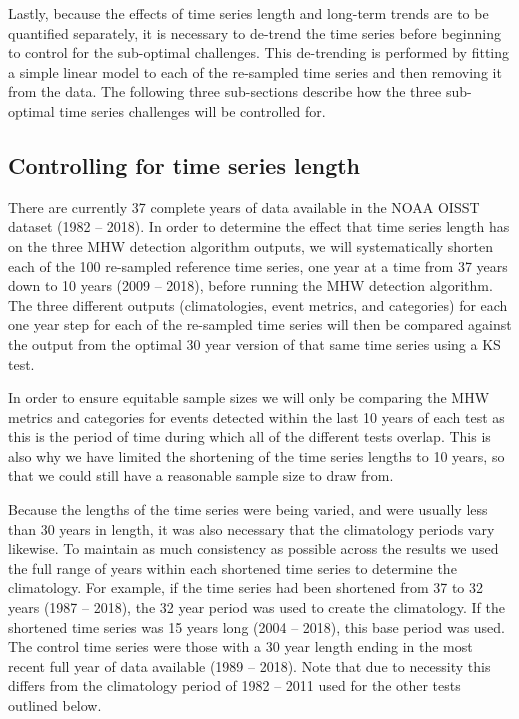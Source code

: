 \documentclass[]{article}
\begin{document}
Lastly, because the effects of time series length and long-term trends
are to be quantified separately, it is necessary to de-trend the time
series before beginning to control for the sub-optimal challenges. This
de-trending is performed by fitting a simple linear model to each of the
re-sampled time series and then removing it from the data. The following
three sub-sections describe how the three sub-optimal time series
challenges will be controlled for.

\subsection{Controlling for time series
length}\label{controlling-for-time-series-length}

There are currently 37 complete years of data available in the NOAA
OISST dataset (1982 -- 2018). In order to determine the effect that time
series length has on the three MHW detection algorithm outputs, we will
systematically shorten each of the 100 re-sampled reference time series,
one year at a time from 37 years down to 10 years (2009 -- 2018), before
running the MHW detection algorithm. The three different outputs
(climatologies, event metrics, and categories) for each one year step
for each of the re-sampled time series will then be compared against the
output from the optimal 30 year version of that same time series using a
KS test.

In order to ensure equitable sample sizes we will only be comparing the
MHW metrics and categories for events detected within the last 10 years
of each test as this is the period of time during which all of the
different tests overlap. This is also why we have limited the shortening
of the time series lengths to 10 years, so that we could still have a
reasonable sample size to draw from.

Because the lengths of the time series were being varied, and were
usually less than 30 years in length, it was also necessary that the
climatology periods vary likewise. To maintain as much consistency as
possible across the results we used the full range of years within each
shortened time series to determine the climatology. For example, if the
time series had been shortened from 37 to 32 years (1987 -- 2018), the
32 year period was used to create the climatology. If the shortened time
series was 15 years long (2004 -- 2018), this base period was used. The
control time series were those with a 30 year length ending in the most
recent full year of data available (1989 -- 2018). Note that due to
necessity this differs from the climatology period of 1982 -- 2011 used
for the other tests outlined below.
\end{document}
